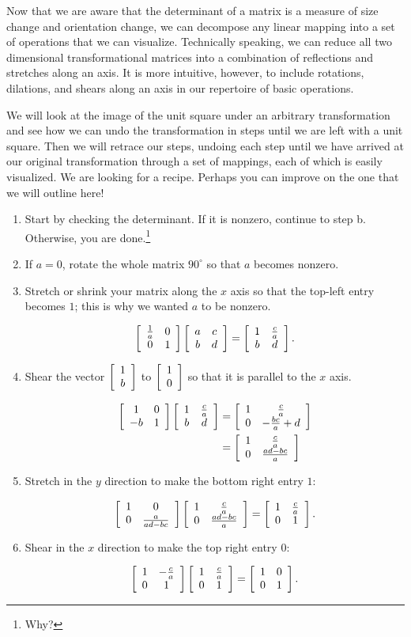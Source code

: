 \documentclass[../gatm.tex]{subfiles}
\begin{document}
Now that we are aware that the determinant of a matrix is a measure of size change and orientation change, we can decompose any linear mapping into a set of operations that we can visualize. Technically speaking, we can reduce all two dimensional transformational matrices into a combination of reflections and stretches along an axis. It is more intuitive, however, to include rotations, dilations, and shears along an axis in our repertoire of basic operations.

We will look at the image of the unit square under an arbitrary transformation and see how we can undo the transformation in steps until we are left with a unit square. Then we will retrace our steps, undoing each step until we have arrived at our original transformation through a set of mappings, each of which is easily visualized. We are looking for a recipe. Perhaps you can improve on the one that we will outline here! %


\begin{enumerate}[label=\roman*.]
\item Start by checking the determinant. If it is nonzero, continue to step b. Otherwise, you are done.\footnote{Why?}
\setcounter{first_para}{\value{enumi}}
\item If $a=0$, rotate the whole matrix $90^\circ$ so that $a$ becomes nonzero.
\item Stretch or shrink your matrix along the $x$ axis so that the top-left entry becomes $1$; this is why we wanted $a$ to be nonzero.

$$\left[\begin{array}{cc} \frac{1}{a} & 0 \\ 0 & 1 \end{array}\right]\left[\begin{array}{cc} a & c \\ b & d \end{array}\right] = \left[\begin{array}{cc} 1 & \frac{c}{a} \\ b & d \end{array}\right].$$

\item Shear the vector $\left[\begin{array}{c} 1 \\ b \end{array}\right]$ to $\left[\begin{array}{c} 1 \\ 0 \end{array}\right]$ so that it is parallel to the $x$ axis.

\begin{align*}
\left[\begin{array}{cc} 1 & 0 \\ -b & 1 \end{array}\right]\left[\begin{array}{cc} 1 & \frac{c}{a} \\ b & d \end{array}\right] &= \left[\begin{array}{cc} 1 & \frac{c}{a} \\ 0 & -\frac{bc}{a}+d \end{array}\right] \\
&= \left[\begin{array}{cc} 1 & \frac{c}{a} \\ 0 & \frac{ad-bc}{a} \end{array}\right]
\end{align*}

\item Stretch in the $y$ direction to make the bottom right entry $1$:

$$\left[\begin{array}{cc} 1 & 0 \\ 0 & \frac{a}{ad-bc} \end{array}\right]\left[\begin{array}{cc} 1 & \frac{c}{a} \\ 0 & \frac{ad-bc}{a} \end{array}\right]=\left[\begin{array}{cc} 1 & \frac{c}{a} \\ 0 & 1 \end{array}\right].$$

\item Shear in the $x$ direction to make the top right entry $0$:

$$\left[\begin{array}{cc} 1 & -\frac{c}{a} \\ 0 & 1 \end{array}\right]\left[\begin{array}{cc} 1 & \frac{c}{a} \\ 0 & 1 \end{array}\right]=\left[\begin{array}{cc} 1 & 0 \\ 0 & 1 \end{array}\right].$$
\end{enumerate}
\end{document}
